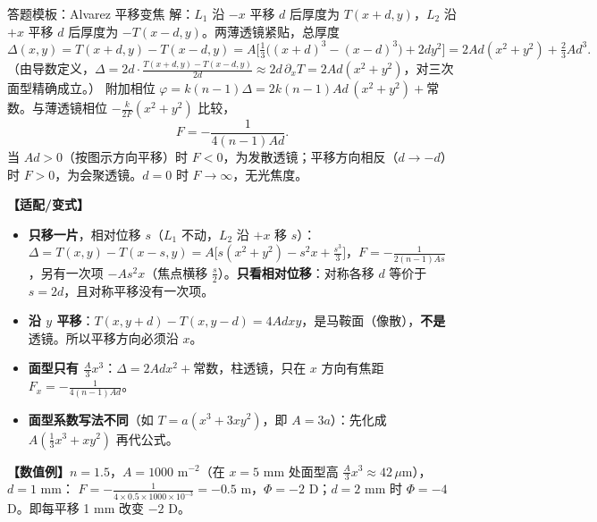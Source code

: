 \begin{exam}{答题模板：Alvarez 平移变焦}
解：$L_1$ 沿 $-x$ 平移 $d$ 后厚度为 $T(x+d,y)$，$L_2$ 沿 $+x$ 平移 $d$ 后厚度为 $-T(x-d,y)$。两薄透镜紧贴，总厚度
\[
\Delta(x,y)=T(x+d,y)-T(x-d,y)=A\Big[\tfrac13\big((x+d)^3-(x-d)^3\big)+2dy^2\Big]=2Ad(x^2+y^2)+\tfrac23Ad^3 .
\]
（由导数定义，$\Delta=2d\cdot\frac{T(x+d,y)-T(x-d,y)}{2d}\approx2d\,\partial_xT=2Ad(x^2+y^2)$，对三次面型精确成立。）
附加相位 $\varphi=k(n-1)\Delta=2k(n-1)Ad\,(x^2+y^2)+$常数。与薄透镜相位 $-\frac{k}{2F}(x^2+y^2)$ 比较，
\[
F=-\frac{1}{4(n-1)Ad}.
\]
当 $Ad>0$（按图示方向平移）时 $F<0$，为发散透镜；平移方向相反（$d\to-d$）时 $F>0$，为会聚透镜。$d=0$ 时 $F\to\infty$，无光焦度。
\end{exam}

\textbf{【适配/变式】}
\begin{itemize}
\item \textbf{只移一片}，相对位移 $s$（$L_1$ 不动，$L_2$ 沿 $+x$ 移 $s$）：$\Delta=T(x,y)-T(x-s,y)=A\big[s(x^2+y^2)-s^2x+\frac{s^3}3\big]$，$F=-\frac{1}{2(n-1)As}$，另有一次项 $-As^2x$（焦点横移 $\frac s2$）。\textbf{只看相对位移}：对称各移 $d$ 等价于 $s=2d$，且对称平移没有一次项。
\item \textbf{沿 $y$ 平移}：$T(x,y+d)-T(x,y-d)=4Adxy$，是马鞍面（像散），\textbf{不是}透镜。所以平移方向必须沿 $x$。
\item \textbf{面型只有 $\frac A3x^3$}：$\Delta=2Adx^2+$常数，柱透镜，只在 $x$ 方向有焦距 $F_x=-\frac1{4(n-1)Ad}$。
\item \textbf{面型系数写法不同}（如 $T=a(x^3+3xy^2)$，即 $A=3a$）：先化成 $A(\frac13x^3+xy^2)$ 再代公式。
\end{itemize}

\textbf{【数值例】}$n=1.5$，$A=1000$ m$^{-2}$（在 $x=5$ mm 处面型高 $\frac A3x^3\approx42\,\mu$m），$d=1$ mm：
$F=-\frac{1}{4\times0.5\times1000\times10^{-3}}=-0.5$ m，$\Phi=-2$ D；$d=2$ mm 时 $\Phi=-4$ D。即每平移 1 mm 改变 $-2$ D。

